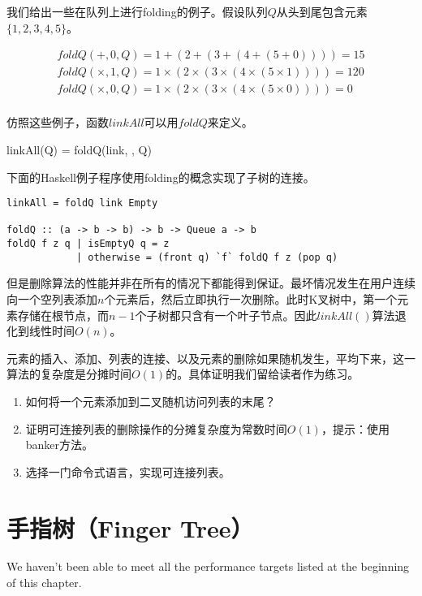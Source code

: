 \documentclass[UTF8]{article}
\begin{document}
我们给出一些在队列上进行folding的例子。假设队列$Q$从头到尾包含元素$\{ 1, 2, 3, 4, 5 \}$。

\[
\begin{array}{l}
foldQ(+, 0, Q) = 1 + (2 + (3 + (4 + (5 + 0)))) = 15 \\
foldQ(\times, 1, Q) = 1 \times (2 \times (3 \times (4 \times (5 \times 1)))) = 120 \\
foldQ(\times, 0, Q) = 1 \times (2 \times (3 \times (4 \times (5 \times 0)))) = 0 \\
\end{array}
\]

仿照这些例子，函数$linkAll$可以用$foldQ$来定义。

\be
linkAll(Q) = foldQ(link, \Phi, Q)
\ee

下面的Haskell例子程序使用folding的概念实现了子树的连接。

\begin{lstlisting}
linkAll = foldQ link Empty

foldQ :: (a -> b -> b) -> b -> Queue a -> b
foldQ f z q | isEmptyQ q = z
            | otherwise = (front q) `f` foldQ f z (pop q)
\end{lstlisting}

但是删除算法的性能并非在所有的情况下都能得到保证。最坏情况发生在用户连续向一个空列表添加$n$个元素后，然后立即执行一次删除。此时K叉树中，第一个元素存储在根节点，而$n-1$个子树都只含有一个叶子节点。因此$linkAll()$算法退化到线性时间$O(n)$。

元素的插入、添加、列表的连接、以及元素的删除如果随机发生，平均下来，这一算法的复杂度是分摊时间$O(1)$的。具体证明我们留给读者作为练习。

\begin{Exercise}
\begin{enumerate}
\item 如何将一个元素添加到二叉随机访问列表的末尾？

\item 证明可连接列表的删除操作的分摊复杂度为常数时间$O(1)$，提示：使用banker方法。

\item 选择一门命令式语言，实现可连接列表。
\end{enumerate}
\end{Exercise}

\section{手指树（Finger Tree）}
We haven't been able to meet all the performance targets listed at the beginning
of this chapter.
\end{document}
